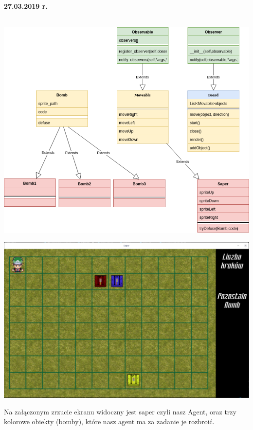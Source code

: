 \documentclass[12pt]{article}
\newcounter{coun}[section]
\begin{document}
\noindent\textbf{27.03.2019 r.}
\setcounter{coun}{0}\\
\\
\begin{center}
\includegraphics[scale=0.47]{logika.png}
\end{center}
\begin{center}
\includegraphics[scale=0.35]{plansza.png}
\end{center}
Na załączonym zrzucie ekranu widoczny jest saper czyli nasz Agent, oraz trzy kolorowe obiekty (bomby), które nasz agent ma za zadanie je rozbroić.\\
\end{document}
